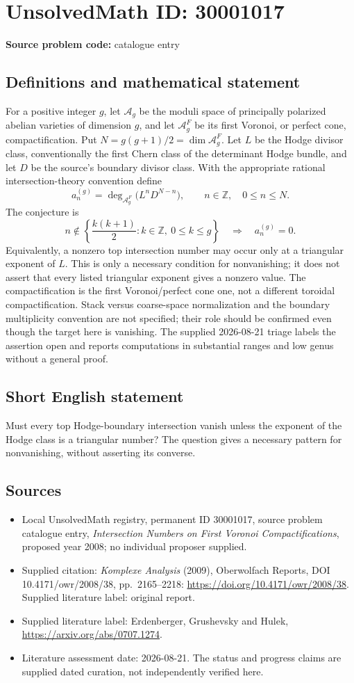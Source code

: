 \documentclass[11pt]{article}
\newcommand{\Z}{\mathbb{Z}}
\begin{document}
\section*{UnsolvedMath ID: 30001017}
\textbf{Source problem code:} catalogue entry
\subsection{Definitions and mathematical statement}
For a positive integer $g$, let $\mathcal A_g$ be the moduli space of principally polarized abelian varieties of dimension $g$, and let $\mathcal A_g^F$ be its first Voronoi, or perfect cone, compactification. Put $N=g(g+1)/2=\dim\mathcal A_g^F$. Let $L$ be the Hodge divisor class, conventionally the first Chern class of the determinant Hodge bundle, and let $D$ be the source's boundary divisor class. With the appropriate rational intersection-theory convention define \[a_n^{(g)}=\deg_{\mathcal A_g^F}\bigl(L^nD^{N-n}\bigr),\qquad n\in\Z,\quad0\leq n\leq N.\] The conjecture is \[n\notin\left\{\frac{k(k+1)}2:k\in\Z,\ 0\leq k\leq g\right\}\quad\Longrightarrow\quad a_n^{(g)}=0.\] Equivalently, a nonzero top intersection number may occur only at a triangular exponent of $L$. This is only a necessary condition for nonvanishing; it does not assert that every listed triangular exponent gives a nonzero value. The compactification is the first Voronoi/perfect cone one, not a different toroidal compactification. Stack versus coarse-space normalization and the boundary multiplicity convention are not specified; their role should be confirmed even though the target here is vanishing. The supplied 2026-08-21 triage labels the assertion open and reports computations in substantial ranges and low genus without a general proof.
\subsection{Short English statement}
Must every top Hodge-boundary intersection vanish unless the exponent of the Hodge class is a triangular number? The question gives a necessary pattern for nonvanishing, without asserting its converse.
\subsection{Sources}
\begin{itemize}\item Local UnsolvedMath registry, permanent ID 30001017, source problem catalogue entry, \emph{Intersection Numbers on First Voronoi Compactifications}, proposed year 2008; no individual proposer supplied.\item Supplied citation: \emph{Komplexe Analysis} (2009), Oberwolfach Reports, DOI 10.4171/owr/2008/38, pp.\ 2165--2218: \url{https://doi.org/10.4171/owr/2008/38}. Supplied literature label: original report.\item Supplied literature label: Erdenberger, Grushevsky and Hulek, \url{https://arxiv.org/abs/0707.1274}.\item Literature assessment date: 2026-08-21. The status and progress claims are supplied dated curation, not independently verified here.\end{itemize}
\end{document}
